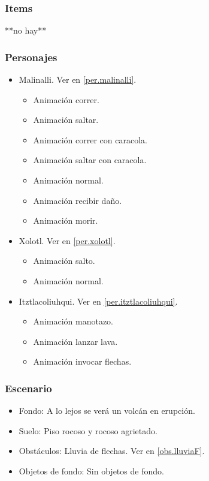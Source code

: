 \documentclass[11pt,letterpaper]{article}
\begin{document}
	\subsubsection{Items}
	**no hay**
	\subsubsection{Personajes}
	\begin{itemize}
		\item Malinalli. Ver en \ref{per.malinalli}.
		\begin{itemize}
			\item Animación correr.
			\item Animación saltar.
			\item Animación correr con caracola.
			\item Animación saltar con caracola.
			\item Animación normal.
			\item Animación recibir daño.
			\item Animación morir.
		\end{itemize}
		\item Xolotl. Ver en \ref{per.xolotl}.
		\begin{itemize}
				\item Animación salto.
				\item Animación normal.
		\end{itemize}
		\item Itztlacoliuhqui. Ver en \ref{per.itztlacoliuhqui}.
		\begin{itemize}
			\item Animación manotazo.
			\item Animación lanzar lava.
			\item Animación invocar flechas.
		\end{itemize}
	\end{itemize}
	\subsubsection{Escenario}
\begin{itemize} 
	\item Fondo: A lo lejos se verá un volcán en erupción.
	\item Suelo: Piso rocoso y rocoso agrietado.
	\item Obstáculos: Lluvia de flechas. Ver en \ref{obs.lluviaF}.
	\item Objetos de fondo: Sin objetos de fondo.
\end{itemize}	
\end{document}
